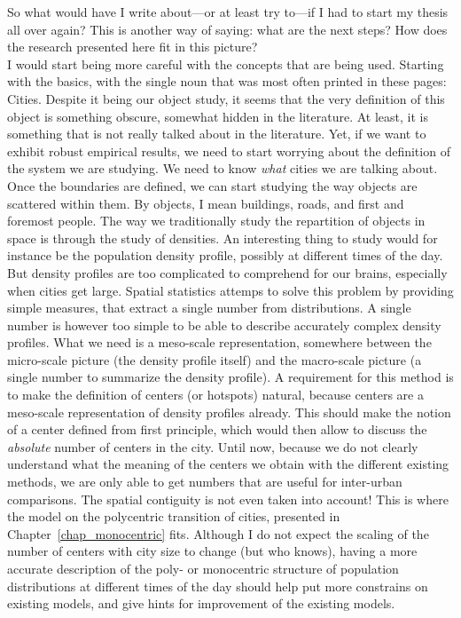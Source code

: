 So what would have I write about---or at least try to---if I had to start my
thesis all over again? This is another way of saying: what are the next steps?
How does the research presented here fit in this picture?\\

I would start being more careful with the concepts that are being used. Starting
with the basics, with the single noun that was most often printed in these
pages: Cities. Despite it being our object study, it seems that the very
definition of this object is something obscure, somewhat hidden in the
literature. At least, it is something that is not really talked about in the
literature. Yet, if we want to exhibit robust empirical results, we need to
start worrying about the definition of the system we are studying. We need to
know \emph{what} cities we are talking about.\\


Once the boundaries are defined, we can start studying the way objects are
scattered within them. By objects, I mean buildings, roads, and first and
foremost people. The way we traditionally study the repartition of objects in
space is through the study of densities. An interesting thing to study would for
instance be the population density profile, possibly at different times of the
day. But density profiles are too complicated to comprehend for our brains,
especially when cities get large. Spatial statistics attemps to solve this
problem by providing simple measures, that extract a single number from
distributions. A single number is however too simple to be able to describe
accurately complex density profiles. What we need is a meso-scale
representation, somewhere between the micro-scale picture (the density profile
itself) and the macro-scale picture (a single number to summarize the density
profile). A requirement for this method is to make the definition of centers (or
hotspots) natural, because centers are a meso-scale representation of density
profiles already. This should make the notion of a center defined from first
principle, which would then allow to discuss the \emph{absolute} number of
centers in the city. Until now, because we do not clearly understand what the
meaning of the centers we obtain with the different existing methods, we are
only able to get numbers that are useful for inter-urban comparisons. The
spatial contiguity is not even taken into account!  This is where the model on
the polycentric transition of cities, presented in
Chapter~\ref{chap_monocentric} fits. Although I do not expect the scaling of the
number of centers with city size to change (but who knows), having a more
accurate description of the poly- or monocentric structure of population
distributions at different times of the day should help put more constrains on
existing models, and give hints for improvement of the existing models.\\


